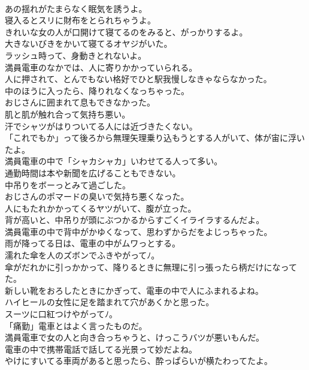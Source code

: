 \documentclass[8pt]{extreport}
\begin{document}
\begin{CJK}{UTF8}{min}
\\	あの揺れがたまらなく眠気を誘うよ。	
\\	寝入るとスリに財布をとられちゃうよ。	
\\	きれいな女の人が口開けて寝てるのをみると、がっかりするよ。	
\\	大きないびきをかいて寝てるオヤジがいた。	
\\	ラッシュ時って、身動きとれないよ。	
\\	満員電車のなかでは、人に寄りかかっていられる。	
\\	人に押されて、とんでもない格好でひと駅我慢しなきゃならなかった。	
\\	中のほうに入ったら、降りれなくなっちゃった。	
\\	おじさんに囲まれて息もできなかった。	
\\	肌と肌が触れ合って気持ち悪い。	
\\	汗でシャツがはりついてる人には近づきたくない。	
\\	「これでもか」って後ろから無理矢理乗り込もうとする人がいて、体が宙に浮いたよ。	
\\	満員電車の中で「シャカシャカ」いわせてる人って多い。	
\\	通勤時間は本や新聞を広げることもできない。	
\\	中吊りをボーっとみて過ごした。	
\\	おじさんのポマードの臭いで気持ち悪くなった。	
\\	人にもたれかかってくるヤツがいて、腹が立った。	
\\	背が高いと、中吊りが頭にぶつかるからすごくイライラするんだよ。	
\\	満員電車の中で背中がかゆくなって、思わずからだをよじっちゃった。	
\\	雨が降ってる日は、電車の中がムワっとする。	
\\	濡れた傘を人のズボンでふきやがってﾉ。	
\\	傘がだれかに引っかかって、降りるときに無理に引っ張ったら柄だけになってた。	
\\	新しい靴をおろしたときにかぎって、電車の中で人にふまれるよね。	
\\	ハイヒールの女性に足を踏まれて穴があくかと思った。	
\\	スーツに口紅つけやがってﾉ。	
\\	「痛勤」電車とはよく言ったものだ。	
\\	満員電車で女の人と向き合っちゃうと、けっこうバツが悪いもんだ。	
\\	電車の中で携帯電話で話してる光景って妙だよね。	
\\	やけにすいてる車両があると思ったら、酔っぱらいが横たわってたよ。	

\end{CJK}
\end{document}
